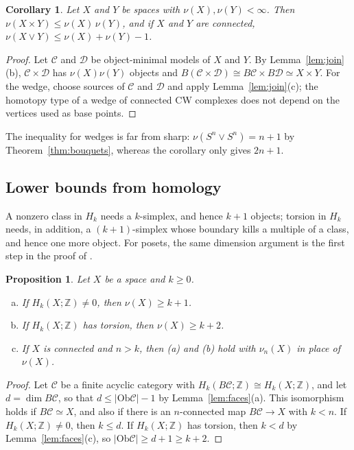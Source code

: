 \documentclass[12pt]{amsart}
\newtheorem{proposition}[teo]{Proposition}
\newtheorem{corollary}[teo]{Corollary}
\theoremstyle{definition}
\theoremstyle{remark}
\newcommand{\CC}{\mathcal{C}}
\newcommand{\DD}{\mathcal{D}}
\newcommand{\Ob}{\mathrm{Ob}}
\newcommand{\Z}{\mathbb{Z}}
\begin{document}
\begin{corollary}\label{cor:nu-product-wedge}
Let $X$ and $Y$ be spaces with $\nu(X),\nu(Y)<\infty$. Then $\nu(X\times Y)\le\nu(X)\,\nu(Y)$, and if $X$ and $Y$ are connected, $\nu(X\vee Y)\le\nu(X)+\nu(Y)-1$.
\end{corollary}

\begin{proof}
Let $\CC$ and $\DD$ be object-minimal models of $X$ and $Y$. By Lemma~\ref{lem:join}(b), $\CC\times\DD$ has $\nu(X)\nu(Y)$ objects and $B(\CC\times\DD)\cong B\CC\times B\DD\simeq X\times Y$. For the wedge, choose sources of $\CC$ and $\DD$ and apply Lemma~\ref{lem:join}(c); the homotopy type of a wedge of connected CW complexes does not depend on the vertices used as base points.
\end{proof}

The inequality for wedges is far from sharp: $\nu(S^n\vee S^n)=n+1$ by Theorem~\ref{thm:bouquets}, whereas the corollary only gives $2n+1$.

\subsection{Lower bounds from homology}\label{subsec:lower-bounds}

A nonzero class in $H_k$ needs a $k$-simplex, and hence $k+1$ objects; torsion in $H_k$ needs, in addition, a $(k+1)$-simplex whose boundary kills a multiple of a class, and hence one more object. For posets, the same dimension argument is the first step in the proof of \cite[Theorem~2.13]{BarmakMinian2007}.

\begin{proposition}\label{prop:bounds}
Let $X$ be a space and $k\ge0$.
\begin{enumerate}[(a)]
\item If $H_k(X;\Z)\neq0$, then $\nu(X)\ge k+1$.
\item If $H_k(X;\Z)$ has torsion, then $\nu(X)\ge k+2$.
\item If $X$ is connected and $n>k$, then (a) and (b) hold with $\nu_n(X)$ in place of $\nu(X)$.
\end{enumerate}
\end{proposition}

\begin{proof}
Let $\CC$ be a finite acyclic category with $H_k(B\CC;\Z)\cong H_k(X;\Z)$, and let $d=\dim B\CC$, so that $d\le|\Ob\CC|-1$ by Lemma~\ref{lem:faces}(a). This isomorphism holds if $B\CC\simeq X$, and also if there is an $n$-connected map $B\CC\to X$ with $k<n$. If $H_k(X;\Z)\neq0$, then $k\le d$. If $H_k(X;\Z)$ has torsion, then $k<d$ by Lemma~\ref{lem:faces}(c), so $|\Ob\CC|\ge d+1\ge k+2$.
\end{proof}
\end{document}
